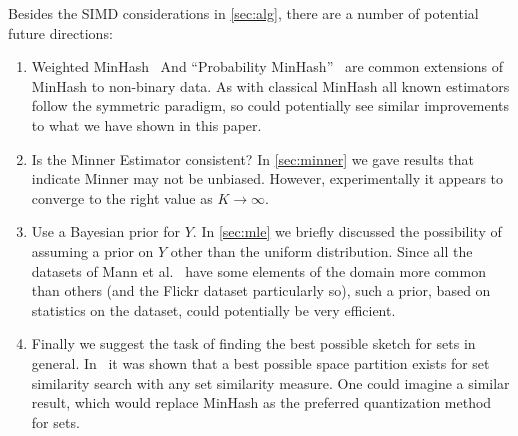 Besides the SIMD considerations in \cref{sec:alg}, there are a number of potential future directions:
\begin{enumerate}
   \item Weighted MinHash~\cite{ioffe2010improved} And ``Probability MinHash''~\cite{moulton2018maximally} are common extensions of MinHash to non-binary data.
      As with classical MinHash all known estimators follow the symmetric paradigm, so could potentially see similar improvements to what we have shown in this paper.
   \item Is the Minner Estimator consistent? In \cref{sec:minner} we gave results that indicate Minner may not be unbiased.
      However, experimentally it appears to converge to the right value as $K\to\infty$.
   \item Use a Bayesian prior for $Y$.
      In \cref{sec:mle} we briefly discussed the possibility of assuming a prior on $Y$ other than the uniform distribution.
      Since all the datasets of Mann et al.~\cite{mann2016empirical} have some elements of the domain more common than others (and the Flickr dataset particularly so), such a prior, based on statistics on the dataset, could potentially be very efficient.
   \item Finally we suggest the task of finding the best possible sketch for sets in general.
      In~\cite{DBLP:conf/focs/AhleK20} it was shown that a best possible space partition exists for set similarity search with any set similarity measure.
      One could imagine a similar result, which would replace MinHash as the preferred quantization method for sets.
\end{enumerate}



